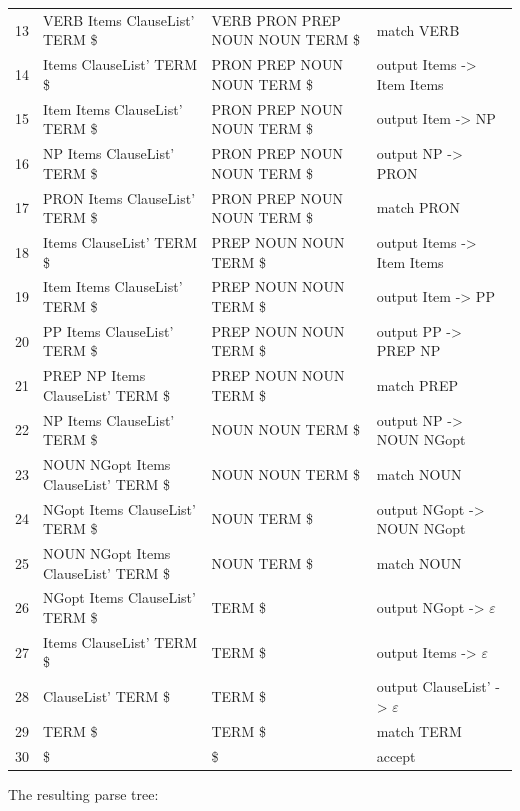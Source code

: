 \documentclass[11pt,a4paper]{article}
\newcommand{\eps}{\ensuremath{\varepsilon}}
\begin{document}
\begin{longtable}{L{0.05} L{0.33} L{0.26} L{0.24}}
13 & VERB Items ClauseList' TERM \$ & VERB PRON PREP NOUN NOUN TERM \$ & match VERB \\
14 & Items ClauseList' TERM \$ & PRON PREP NOUN NOUN TERM \$ & output Items -> Item Items \\
15 & Item Items ClauseList' TERM \$ & PRON PREP NOUN NOUN TERM \$ & output Item -> NP \\
16 & NP Items ClauseList' TERM \$ & PRON PREP NOUN NOUN TERM \$ & output NP -> PRON \\
17 & PRON Items ClauseList' TERM \$ & PRON PREP NOUN NOUN TERM \$ & match PRON \\
18 & Items ClauseList' TERM \$ & PREP NOUN NOUN TERM \$ & output Items -> Item Items \\
19 & Item Items ClauseList' TERM \$ & PREP NOUN NOUN TERM \$ & output Item -> PP \\
20 & PP Items ClauseList' TERM \$ & PREP NOUN NOUN TERM \$ & output PP -> PREP NP \\
21 & PREP NP Items ClauseList' TERM \$ & PREP NOUN NOUN TERM \$ & match PREP \\
22 & NP Items ClauseList' TERM \$ & NOUN NOUN TERM \$ & output NP -> NOUN NGopt \\
23 & NOUN NGopt Items ClauseList' TERM \$ & NOUN NOUN TERM \$ & match NOUN \\
24 & NGopt Items ClauseList' TERM \$ & NOUN TERM \$ & output NGopt -> NOUN NGopt \\
25 & NOUN NGopt Items ClauseList' TERM \$ & NOUN TERM \$ & match NOUN \\
26 & NGopt Items ClauseList' TERM \$ & TERM \$ & output NGopt -> \eps{} \\
27 & Items ClauseList' TERM \$ & TERM \$ & output Items -> \eps{} \\
28 & ClauseList' TERM \$ & TERM \$ & output ClauseList' -> \eps{} \\
29 & TERM \$ & TERM \$ & match TERM \\
30 & \$ & \$ & accept \\
\end{longtable}
\endgroup

The resulting parse tree:
\end{document}
